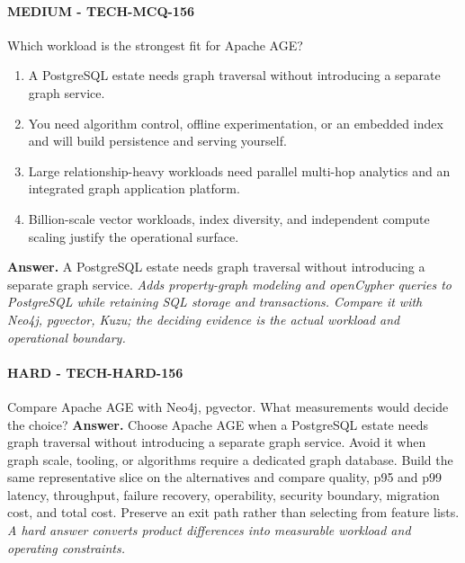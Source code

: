 \paragraph{MEDIUM - TECH-MCQ-156} Which workload is the strongest fit for Apache AGE?
\begin{enumerate}[label=\Alph*.]
\item A PostgreSQL estate needs graph traversal without introducing a separate graph service.
\item You need algorithm control, offline experimentation, or an embedded index and will build persistence and serving yourself.
\item Large relationship-heavy workloads need parallel multi-hop analytics and an integrated graph application platform.
\item Billion-scale vector workloads, index diversity, and independent compute scaling justify the operational surface.
\end{enumerate}
\textbf{Answer.} A PostgreSQL estate needs graph traversal without introducing a separate graph service.
\textit{Adds property-graph modeling and openCypher queries to PostgreSQL while retaining SQL storage and transactions. Compare it with Neo4j, pgvector, Kuzu; the deciding evidence is the actual workload and operational boundary.}
\paragraph{HARD - TECH-HARD-156} Compare Apache AGE with Neo4j, pgvector. What measurements would decide the choice?
\textbf{Answer.} Choose Apache AGE when a PostgreSQL estate needs graph traversal without introducing a separate graph service. Avoid it when graph scale, tooling, or algorithms require a dedicated graph database. Build the same representative slice on the alternatives and compare quality, p95 and p99 latency, throughput, failure recovery, operability, security boundary, migration cost, and total cost. Preserve an exit path rather than selecting from feature lists.
\textit{A hard answer converts product differences into measurable workload and operating constraints.}
